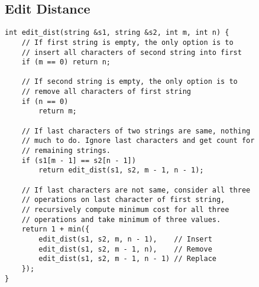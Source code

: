 \documentclass[10pt,letterpaper,twocolumn,twosided]{article}
\begin{document}
\subsection{Edit Distance}
\begin{lstlisting}
int edit_dist(string &s1, string &s2, int m, int n) {
    // If first string is empty, the only option is to
    // insert all characters of second string into first
    if (m == 0) return n;

    // If second string is empty, the only option is to
    // remove all characters of first string
    if (n == 0)
        return m;
 
    // If last characters of two strings are same, nothing
    // much to do. Ignore last characters and get count for
    // remaining strings.
    if (s1[m - 1] == s2[n - 1])
        return edit_dist(s1, s2, m - 1, n - 1);
 
    // If last characters are not same, consider all three
    // operations on last character of first string,
    // recursively compute minimum cost for all three
    // operations and take minimum of three values.
    return 1 + min({
        edit_dist(s1, s2, m, n - 1),    // Insert
        edit_dist(s1, s2, m - 1, n),    // Remove
        edit_dist(s1, s2, m - 1, n - 1) // Replace
    });
}
\end{lstlisting}
\end{document}
